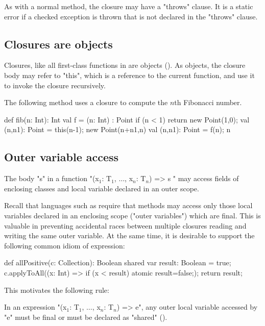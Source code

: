 As with a normal method, the closure may have a \xcd"throws" clause. It is a
static error if a checked exception is thrown that is not declared in
the \xcd"throws" clause.

\subsection{Closures are objects}

Closures, like all first-class functions in \Xten{} are
objects
().
As objects, the closure body may refer to
\xcd"this", which is a reference to the current function,
and use it to invoke the closure recursively.

\begin{example}
The following method uses a closure to compute the $n$th
Fibonacci number.
\begin{xten}
def fib(n: Int): Int {
    val f = (n: Int) : Point {
        if (n < 1) return new Point(1,0);
        val (n,n1): Point = this(n-1);
        new Point(n+n1,n)
    }
    val (n,n1): Point = f(n);
    n
}
\end{xten}
\end{example}

\subsection{Outer variable access}

The body \xcd"s" in a function
\xcdmath"(x$_1$: T$_1$, $\dots$, x$_n$: T$_n$) => { s }"
may access fields
of enclosing classes and local variable declared in an outer scope.

Recall that languages such as \java{} require that methods may
access only those local variables declared in an enclosing scope
("outer variables") which are final. This is valuable in
preventing accidental races between multiple closures reading
and writing the same outer variable. At the same time, it is
desirable to support the following common idiom of expression:

\begin{xten}
def allPositive(c: Collection): Boolean {
  shared var result: Boolean = true;
  c.applyToAll((x: Int) => { if (x < result) atomic {result=false;}});
  return result;
}
\end{xten}

This motivates the following rule:

\begin{staticrule*}
In an expression
\xcdmath"(x$_1$: T$_1$, $\dots$, x$_n$: T$_n$) => e",
any outer local variable accessed by \xcd"e" must be final or
must be declared
as \xcd"shared" ().
\end{staticrule*}

